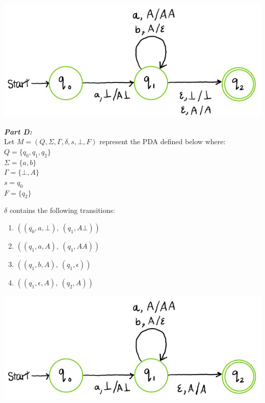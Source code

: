 \documentclass[11pt,fleqn]{article}
\newcommand{\be}{\begin{enumerate}}
\newcommand{\ee}{\end{enumerate}}
\newcommand{\set}[1]{{\{ #1 \}}}
\begin{document}
	\begin{center}
	\includegraphics[scale = 0.5]{partC.JPG}
	\end{center}

	\noindent\textbf{\emph{Part D:}}\\
	Let $M = (Q, \Sigma, \Gamma, \delta, s, \bot, F)$ represent the PDA defined below where:\\
	$Q = \set{q_0, q_1, q_2}$\\
	$\Sigma = \set{a, b}$\\
	$\Gamma = \set{\bot, A}$\\
	$s = q_0$\\
	$F = \set{q_2}$

	\noindent$\delta$ contains the following transitions:
	\be
	\item $((q_0, a, \bot),\ (q_1, A\bot))$
	\item $((q_1, a, A),\ (q_1, AA))$
	\item $((q_1, b, A),\ (q_1, \epsilon))$
	\item $((q_1, \epsilon, A),\ (q_2, A))$
	\ee
	
	\begin{center}
	\includegraphics[scale = 0.5]{partD.JPG}
	\end{center}

	
	
\end{document}
